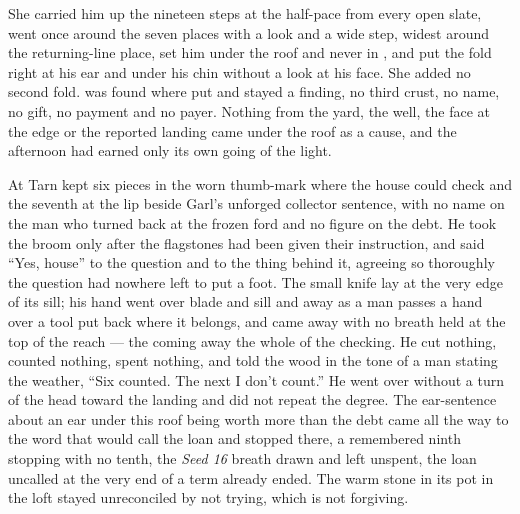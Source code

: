 She carried him up the nineteen steps at the half-pace from every open slate, went once around the seven places with a look and a wide step, widest around the returning-line place, set him under the roof and never in , and put the fold right at his ear and under his chin without a look at his face. She added no second fold.  was found where put and stayed a finding, no third crust, no name, no gift, no payment and no payer. Nothing from the yard, the well, the face at the edge or the reported landing came under the roof as a cause, and the afternoon had earned only its own going of the light.

At  Tarn kept six pieces in the worn thumb-mark where the house could check and the seventh at the lip beside Garl's unforged collector sentence, with no name on the man who turned back at the frozen ford and no figure on the debt. He took the broom only after the flagstones had been given their instruction, and said “Yes, house” to the question and to the thing behind it, agreeing so thoroughly the question had nowhere left to put a foot. The small knife lay at the very edge of its sill; his hand went over blade and sill and away as a man passes a hand over a tool put back where it belongs, and came away with no breath held at the top of the reach --- the coming away the whole of the checking. He cut nothing, counted nothing, spent nothing, and told the wood in the tone of a man stating the weather, “Six counted. The next I don't count.” He went over  without a turn of the head toward the landing and did not repeat the degree. The ear-sentence about an ear under this roof being worth more than the debt came all the way to the word that would call the loan and stopped there, a remembered ninth stopping with no tenth, the \emph{Seed 16} breath drawn and left unspent, the loan uncalled at the very end of a term already ended. The warm stone in its pot in the loft stayed unreconciled by not trying, which is not forgiving.

